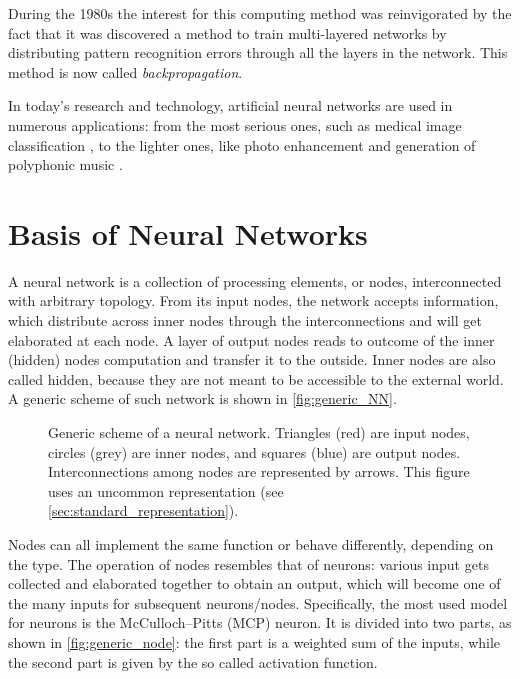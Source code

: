During the 1980s the interest for this computing method was reinvigorated by the fact that it was discovered a method to train multi-layered networks by distributing pattern recognition errors through all the layers in the network.
This method is now called \textit{backpropagation}.

In today's research and technology, artificial neural networks are used in numerous applications: from the most serious ones, such as medical image classification \cite{li2014medical}, to the lighter ones, like photo enhancement \cite{ignatov2017wespe} and generation of polyphonic music \cite{johnson2017generating, briot2017deep}.

\section{Basis of Neural Networks}
\label{sec:Basis_of_Neural_Networks}

A neural network is a collection of processing elements, or nodes, interconnected with arbitrary topology.
From its input nodes, the network accepts information, which distribute across inner nodes through the interconnections and will get elaborated at each node.
A layer of output nodes reads to outcome of the inner (hidden) nodes computation and transfer it to the outside.
Inner nodes are also called hidden, because they are not meant to be accessible to the external world.
A generic scheme of such network is shown in \autoref{fig:generic_NN}.

\begin{figure}[ht]
	\centering
	
	\caption{
		Generic scheme of a neural network.
		Triangles (red) are input nodes, circles (grey) are inner nodes,
		and squares (blue) are output nodes.
		Interconnections among nodes are represented by arrows.
		This figure uses an uncommon representation
		(see \autoref{sec:standard_representation}).
	}
	\label{fig:generic_NN}
\end{figure}

Nodes can all implement the same function or behave differently, depending on the type.
The operation of nodes resembles that of neurons: various input gets collected and elaborated together to obtain an output, which will become one of the many inputs for subsequent neurons/nodes.
Specifically, the most used model for neurons is the McCulloch–Pitts (MCP) neuron.
It is divided into two parts, as shown in \autoref{fig:generic_node}: the first part is a weighted sum of the inputs, while the second part is given by the so called activation function.


